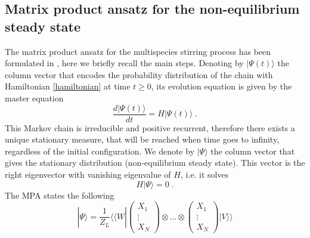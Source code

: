 \documentclass[10pt]{article}
\numberwithin{equation}{section}
\numberwithin{equation}{subsection}
\newcommand{\dt}{\;.}
\begin{document}

\subsection{Matrix product ansatz for the non-equilibrium steady state}
The matrix product ansatz for the multispecies stirring process has been formulated in \cite{vanicat2017exact}, here we briefly recall the main steps.
 Denoting by $|\Psi(t)\rangle$ the column vector that encodes the probability distribution of the chain with Hamiltonian \eqref{hamiltonian} at time $t\geq 0$, its evolution equation is given by 
 the master equation
\begin{equation}
    \frac{d|{\Psi}(t)\rangle}{dt}=H|{\Psi}(t)\rangle\dt
\end{equation}
This Markov chain is irreducible and positive recurrent, therefore there exists a unique stationary measure, that will be reached when time goes to infinity, regardless of the initial configuration. 
We denote by $|\Psi\rangle$ the column vector that gives the stationary distribution (non-equilibrium steady state). This vector is the right eigenvector with vanishing eigenvalue of $H$, i.e. it solves 
\begin{equation}\label{definition-SteadyStateH}
	H|\Psi\rangle =0\dt
\end{equation}
The MPA states the following
\begin{equation}
	|\Psi\rangle=\frac{1}{Z_{L}} \langle \langle W|  \begin{pmatrix}
		X_{1}\\
		\vdots\\
		X_{N}
	\end{pmatrix}\otimes \ldots\otimes \begin{pmatrix}
		X_{1}\\
		\vdots\\
		X_{N}
	\end{pmatrix} |V\rangle\rangle 
\end{equation}
\end{document}
